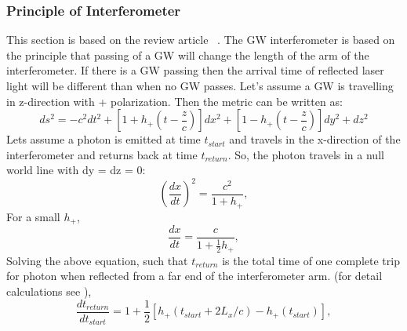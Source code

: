 \documentclass{ttuthes2007}
\begin{document}
\subsubsection{Principle of Interferometer}
This section is based on the review article ~\citet{Sathyaprakash_2009}. The
\ac{GW} interferometer is based on the principle that passing of a \ac{GW} will
change the length of the arm of the interferometer. If there is a \ac{GW}
passing then the arrival time of reflected laser light will be different than when no
\ac{GW} passes. Let's assume a \ac{GW} is travelling in z-direction with +
polarization. Then the metric can be written as:
\begin{equation}
ds^2= -c^2dt^2+[1+h_+(t-\frac{z}{c})]dx^2+[1-h_+(t-\frac{z}{c})]dy^2+dz^2
\end{equation}
Lets assume a photon is emitted at time $t_{start}$ and travels
in the x-direction of the interferometer and returns back at time $t_{return}$. So,
the photon travels in a null world line with dy = dz = 0:
\begin{equation}
\left(\frac{dx}{dt}\right)^2=\frac{c^2}{1+h_+},
\end{equation}
For a small $h_+$,
\begin{equation}
\frac{dx}{dt}=\frac{c}{1+\frac{1}{2}h_+},
\end{equation}
Solving the above equation, such that  $t_{return}$ is the total time of one
complete trip for photon when reflected from a far end of the interferometer
arm. (for detail calculations see \cite{Schutz:1985jx}),
\begin{equation}
\frac{dt_{return}}{dt_{start}}=1+\frac{1}{2}[h_+(t_{start}+2L_x/c)-h_+(t_{start})],
\end{equation}
\end{document}
